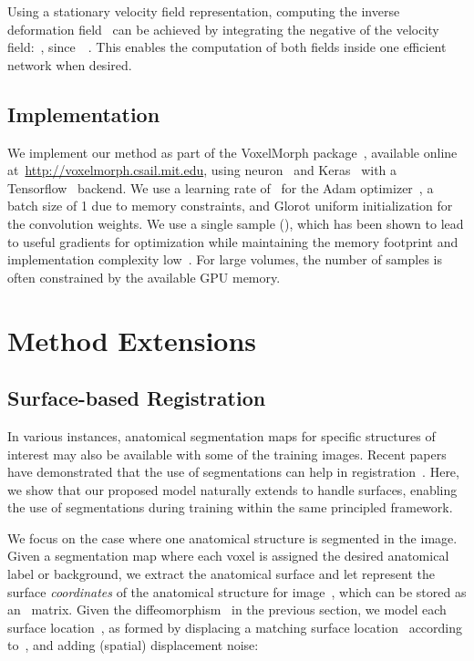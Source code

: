 \documentclass{article}
\newcommand{\citep}{\cite}
\begin{document}
Using a stationary velocity field representation, computing the inverse deformation field~ can be achieved by integrating the negative of the velocity field:~, since~~\citep{ashburner2007,modat2014}. This enables the computation of both fields inside one efficient network when desired.

{\color{blue}
\subsection{Implementation}

We implement our method as part of the VoxelMorph package~\citep{balakrishnan2018a}, available online at~\mbox{\url{http://voxelmorph.csail.mit.edu}}, using neuron~\citep{dalca2018priors} and Keras~\citep{chollet2015} with a Tensorflow~\citep{abadi2016} backend. We use a learning rate of~ for the Adam optimizer~\cite{kingma2014}, a batch size of 1 due to memory constraints, and Glorot uniform initialization for the convolution weights. We use a single sample (), which has been shown to lead to useful gradients for optimization while maintaining the memory footprint and implementation complexity low~\citep{kingma2013}. For large volumes, the number of samples is often constrained by the available GPU memory. }






\section{Method Extensions}


\subsection{Surface-based Registration}



In various instances, anatomical segmentation maps for specific structures of interest may also be available with some of the training images. Recent papers have demonstrated that the use of segmentations can help in registration~\citep{balakrishnan2019,hu2018label}. Here, we show that our proposed model naturally extends to handle surfaces, enabling the use of segmentations during training within the same principled framework. 

We focus on the case where one anatomical structure is segmented in the image. Given a segmentation map where each voxel is assigned the desired anatomical label or background, we extract the anatomical surface and let  represent the~ surface \textit{coordinates} of the anatomical structure for image~, which can be stored as an~ matrix. Given the diffeomorphism~ in the previous section, we model each surface location~, as formed by displacing a matching surface location~ according to~, and adding (spatial) displacement noise:
\end{document}
